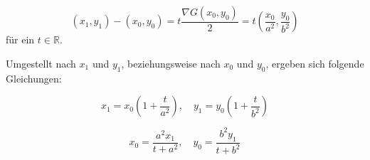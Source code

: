 \begin{equation}
	(x_1,y_1) - (x_0, y_0) = t\frac{\nabla G(x_0,y_0)}{2} = t\left(\frac{x_0}{a^2},\frac{y_0}{b^2}\right)
\end{equation}
für ein $t\in\mathbb{R}$.

Umgestellt nach $x_1$ und $y_1$, beziehungsweise nach $x_0$ und $y_0$, ergeben sich folgende Gleichungen:

\begin{equation}\label{eq:ellipseDistY}
x_1 = x_0\left(1 + \frac{t}{a^2}\right), \quad y_1 = y_0\left(1 + \frac{t}{b^2}\right)
\end{equation}

\begin{equation}\label{eq:ellipseDistX}
x_0 = \frac{a^2x_1}{t+a^2},\quad y_0 = \frac{b^2y_1}{t+b^2}
\end{equation}


